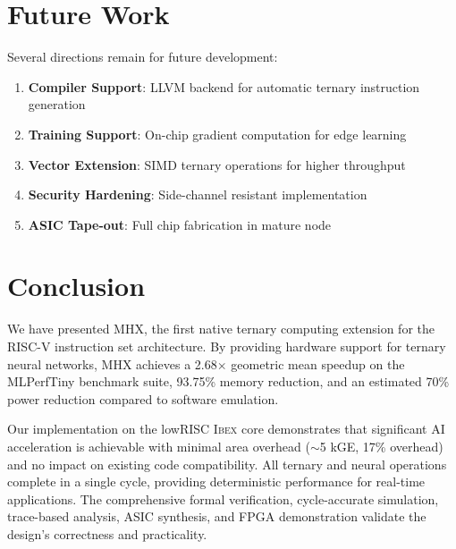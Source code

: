 \documentclass[conference,10pt]{IEEEtran}
\newcommand{\mhx}{\textsc{MHX\texttrademark}}
\newcommand{\ibex}{\textsc{Ibex}}
\newcommand{\riscv}{RISC-V}
\begin{document}
\section{Future Work}
\label{sec:future}

Several directions remain for future development:

\begin{enumerate}
    \item \textbf{Compiler Support}: LLVM backend for automatic ternary instruction generation
    \item \textbf{Training Support}: On-chip gradient computation for edge learning
    \item \textbf{Vector Extension}: SIMD ternary operations for higher throughput
    \item \textbf{Security Hardening}: Side-channel resistant implementation
    \item \textbf{ASIC Tape-out}: Full chip fabrication in mature node
\end{enumerate}

\section{Conclusion}
\label{sec:conclusion}

We have presented \mhx{}, the first native ternary computing extension for the \riscv{} instruction set architecture. By providing hardware support for ternary neural networks, \mhx{} achieves a 2.68$\times$ geometric mean speedup on the MLPerfTiny benchmark suite, 93.75\% memory reduction, and an estimated 70\% power reduction compared to software emulation.

Our implementation on the lowRISC \ibex{} core demonstrates that significant AI acceleration is achievable with minimal area overhead ($\sim$5 kGE, 17\% overhead) and no impact on existing code compatibility. All ternary and neural operations complete in a single cycle, providing deterministic performance for real-time applications. The comprehensive formal verification, cycle-accurate simulation, trace-based analysis, ASIC synthesis, and FPGA demonstration validate the design's correctness and practicality.
\end{document}
